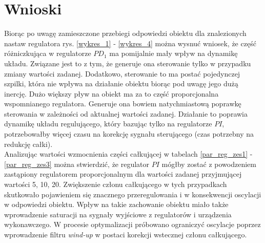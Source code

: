 \chapter{Wnioski}

Biorąc po uwagę zamieszczone przebiegi odpowiedzi obiektu dla znalezionych nastaw regulatora rys. \ref{wykres_1} - \ref{wykres_4} można wysnuć wniosek, że część różniczkująca w regulatorze $PD_1$ ma pomijalnie mały wpływ na dynamikę układu. Związane jest to z tym, że generuje ona sterowanie tylko w przypadku zmiany wartości zadanej. Dodatkowo, sterowanie to ma postać pojedynczej szpilki, która nie wpływa na działanie obiektu biorąc pod uwagę jego dużą inercję. Dużo większy pływ na obiekt ma za to część proporcjonalna wspomnianego regulatora. Generuje ona bowiem natychmiastową poprawkę sterowania w zależności od aktualnej wartości zadanej. Działanie to poprawia dynamikę układu regulującego, który bazując tylko na regulatorze $PI$, potrzebowałby więcej czasu na korekcję sygnału sterującego (czas potrzebny na redukcję całki). \\   
Analizując wartości wzmocnienia części całkującej w tabelach \ref{par_reg_zes1} - \ref{par_reg_zes3} można stwierdzić, że regulator $PI$ mógłby zostać z powodzeniem zastąpiony regulatorem proporcjonalnym dla wartości zadanej przyjmującej wartości 5, 10, 20.  Zwiększenie członu całkującego w tych przypadkach skutkowało pojawieniem się znacznego przeregulowania i w konsekwencji oscylacji w odpowiedzi obiektu. Wpływ na takie zachowanie obiektu miało także wprowadzenie saturacji na sygnały wyjściowe z regulatorów i urządzenia wykonawczego. W procesie optymalizacji próbowano ograniczyć oscylacje poprzez wprowadzenie filtru \textit{wind-up} w postaci korekcji wstecznej członu całkującego. \\ 
